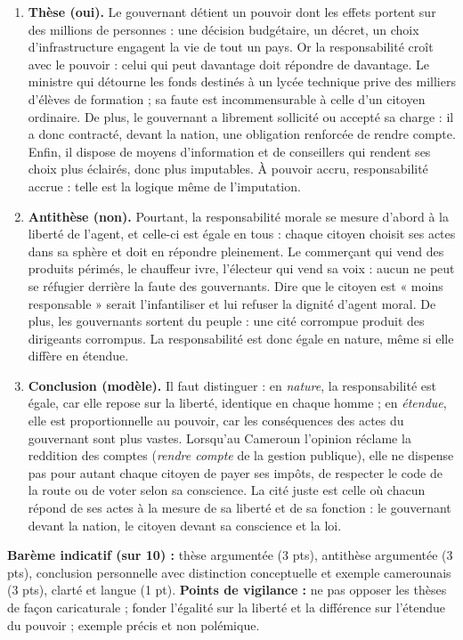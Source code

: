 \documentclass[11pt]{article}
\begin{document}
\begin{corrige}
\begin{enumerate}
\item \textbf{Thèse (oui).} Le gouvernant détient un pouvoir dont les effets portent sur des millions de personnes : une décision budgétaire, un décret, un choix d'infrastructure engagent la vie de tout un pays. Or la responsabilité croît avec le pouvoir : celui qui peut davantage doit répondre de davantage. Le ministre qui détourne les fonds destinés à un lycée technique prive des milliers d'élèves de formation ; sa faute est incommensurable à celle d'un citoyen ordinaire. De plus, le gouvernant a librement sollicité ou accepté sa charge : il a donc contracté, devant la nation, une obligation renforcée de rendre compte. Enfin, il dispose de moyens d'information et de conseillers qui rendent ses choix plus éclairés, donc plus imputables. À pouvoir accru, responsabilité accrue : telle est la logique même de l'imputation.
\item \textbf{Antithèse (non).} Pourtant, la responsabilité morale se mesure d'abord à la liberté de l'agent, et celle-ci est égale en tous : chaque citoyen choisit ses actes dans sa sphère et doit en répondre pleinement. Le commerçant qui vend des produits périmés, le chauffeur ivre, l'électeur qui vend sa voix : aucun ne peut se réfugier derrière la faute des gouvernants. Dire que le citoyen est « moins responsable » serait l'infantiliser et lui refuser la dignité d'agent moral. De plus, les gouvernants sortent du peuple : une cité corrompue produit des dirigeants corrompus. La responsabilité est donc égale en nature, même si elle diffère en étendue.
\item \textbf{Conclusion (modèle).} Il faut distinguer : en \emph{nature}, la responsabilité est égale, car elle repose sur la liberté, identique en chaque homme ; en \emph{étendue}, elle est proportionnelle au pouvoir, car les conséquences des actes du gouvernant sont plus vastes. Lorsqu'au Cameroun l'opinion réclame la reddition des comptes (\emph{rendre compte} de la gestion publique), elle ne dispense pas pour autant chaque citoyen de payer ses impôts, de respecter le code de la route ou de voter selon sa conscience. La cité juste est celle où chacun répond de ses actes à la mesure de sa liberté et de sa fonction : le gouvernant devant la nation, le citoyen devant sa conscience et la loi.
\end{enumerate}
\textbf{Barème indicatif (sur 10) :} thèse argumentée (3 pts), antithèse argumentée (3 pts), conclusion personnelle avec distinction conceptuelle et exemple camerounais (3 pts), clarté et langue (1 pt).
\textbf{Points de vigilance :} ne pas opposer les thèses de façon caricaturale ; fonder l'égalité sur la liberté et la différence sur l'étendue du pouvoir ; exemple précis et non polémique.
\end{corrige}
\end{document}
